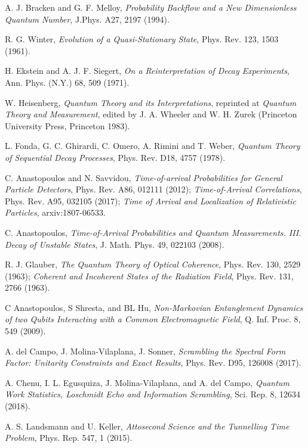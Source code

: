 \documentclass[12pt]{article}
\numberwithin{equation}{section}
\begin{document}
\begin{thebibliography}{}
     A. J. Bracken and G. F. Melloy,  {\em Probability Backflow and a New Dimensionless Quantum Number},  J.Phys. A27, 2197 (1994).

 R. G. Winter, {\em Evolution of a Quasi-Stationary State}, Phys. Rev. 123, 1503 (1961).

         H. Ekstein and A. J. F. Siegert, {\em On a Reinterpretation of Decay Experiments}, Ann. Phys. (N.Y.) 68, 509 (1971).

             W. Heisenberg, {\em Quantum Theory and its Interpretations}, reprinted at {\em Quantum Theory and Measurement}, edited by  J. A. Wheeler and W. H. Zurek (Princeton University Press, Princeton 1983).

          L. Fonda,  G. C. Ghirardi, C. Omero, A. Rimini and T. Weber, {\em Quantum Theory of Sequential Decay Processes}, Phys. Rev. D18, 4757 (1978).

   C. Anastopoulos and N. Savvidou,  {\em Time-of-arrival Probabilities for General Particle Detectors}, Phys. Rev. A86, 012111 (2012); {\em Time-of-Arrival Correlations}, Phys. Rev. A95, 032105 (2017); {\em Time of Arrival and Localization of Relativistic Particles}, arxiv:1807-06533.

 C. Anastopoulos, {\em Time-of-Arrival Probabilities and Quantum Measurements. III. Decay of Unstable States}, J. Math. Phys. 49, 022103 (2008).


  R. J. Glauber, {\em The Quantum Theory of Optical Coherence}, Phys. Rev. 130, 2529 (1963);  {\em Coherent and Incoherent States of the Radiation Field}, Phys. Rev. 131, 2766 (1963).


   C Anastopoulos, S Shresta, and BL Hu, {\em Non-Markovian Entanglement Dynamics of two Qubits Interacting with a Common Electromagnetic Field}, Q. Inf. Proc. 8, 549 (2009).

 A. del Campo, J. Molina-Vilaplana, J. Sonner, {\em Scrambling the Spectral Form Factor: Unitarity Constraints and Exact Results}, Phys. Rev. D95, 126008 (2017).



 A. Chenu, I. L. Egusquiza, J. Molina-Vilaplana, and  A. del Campo, {\em Quantum Work Statistics, Loschmidt Echo and Information Scrambling}, Sci. Rep. 8, 12634 (2018).



 A. S. Landsmann and U. Keller, {\em Attosecond Science and the Tunnelling Time Problem}, Phys. Rep. 547, 1 (2015).


\end{thebibliography}
\end{document}
